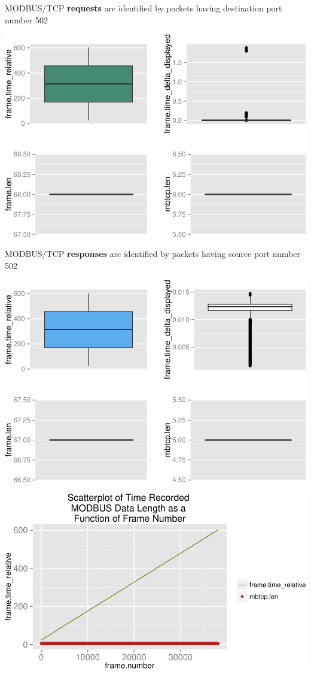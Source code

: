\documentclass[]{article}
\begin{document}
MODBUS/TCP \textbf{requests} are identified by packets having
destination port number 502

\begin{center}\includegraphics{modbus_files/figure-latex/unnamed-chunk-14-1} \end{center}

\pagebreak

MODBUS/TCP \textbf{responses} are identified by packets having source
port number 502

\begin{center}\includegraphics{modbus_files/figure-latex/unnamed-chunk-16-1} \end{center}

\pagebreak

\includegraphics{modbus_files/figure-latex/unnamed-chunk-17-1.pdf}
\end{document}
